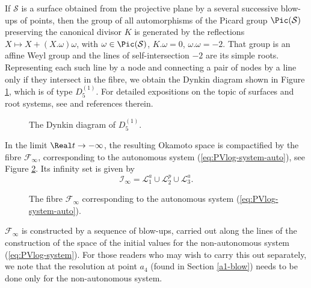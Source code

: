 If $\mathcal{S}$ is a surface obtained from the projective plane by a several successive blow-ups of points, then the group of all automorphisms of the Picard group $\Pic(\mathcal{S})$ preserving the canonical divisor $K$ is generated by the reflections
$X\mapsto X+(X.\omega)\omega$,
with $\omega\in\Pic(\mathcal{S})$, $K.\omega=0$, $\omega.\omega=-2$.
That group is an affine Weyl group and the lines of self-intersection $-2$ are its simple roots.
Representing each such line by a node and connecting a pair of nodes by a line only if they intersect in the fibre, we obtain the Dynkin diagram shown in Figure \ref{fig:dynkin}, which is of type $D_5^{(1)}$.
For detailed expositions on the topic of surfaces and root systems, see \cite{Demazure1980, Harbourne1985} and references therein.

\begin{figure}[h]
\centering

\caption{The Dynkin diagram of $D_5^{(1)}$.}\label{fig:dynkin}
\end{figure}


In the limit $\Real t\to-\infty$, the resulting Okamoto space is compactified by the fibre $\mathcal{F}_{\infty}$, corresponding to the autonomous system (\ref{eq:PVlog-system-auto}), see Figure \ref{fig:okamoto-blow-down-limit}.
Its infinity set is given by
$$
\mathcal{I}_{\infty}=\mathcal{L}_1^a\cup\mathcal{L}_2^p\cup\mathcal{L}_3^a.
$$
\begin{figure}[h]
\centering

\caption{The fibre $\mathcal{F}_{\infty}$ corresponding to the autonomous system (\ref{eq:PVlog-system-auto}).}\label{fig:okamoto-blow-down-limit}
\end{figure}
$\mathcal{F}_{\infty}$ is constructed by a sequence of blow-ups, carried out along the lines of the construction of the space of the initial values for the non-autonomous system (\ref{eq:PVlog-system}).
For those readers who may wish to carry this out separately, we note that the resolution at point $a_4$ (found in Section \ref{a1-blow}) needs to be done only for the non-autonomous system.



